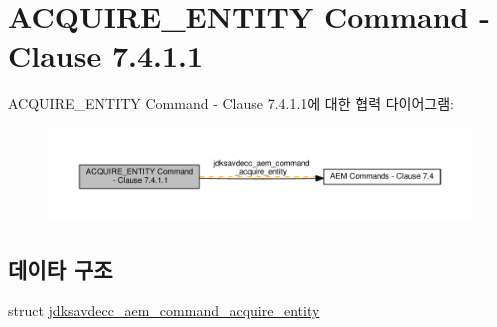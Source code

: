 \hypertarget{group__command__acquire__entity}{}\section{A\+C\+Q\+U\+I\+R\+E\+\_\+\+E\+N\+T\+I\+TY Command -\/ Clause 7.4.1.1}
\label{group__command__acquire__entity}
A\+C\+Q\+U\+I\+R\+E\+\_\+\+E\+N\+T\+I\+TY Command -\/ Clause 7.4.1.1에 대한 협력 다이어그램\+:
\nopagebreak
\begin{figure}[H]
\begin{center}
\leavevmode
\includegraphics[width=350pt]{group__command__acquire__entity}
\end{center}
\end{figure}
\subsection*{데이타 구조}
\begin{DoxyCompactItemize}
\item 
struct \hyperlink{structjdksavdecc__aem__command__acquire__entity}{jdksavdecc\+\_\+aem\+\_\+command\+\_\+acquire\+\_\+entity}
\end{DoxyCompactItemize}
